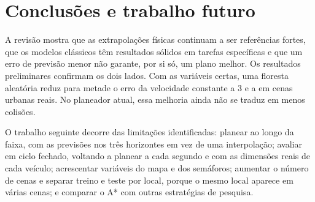 \section{Conclusões e trabalho futuro}
\label{sec:conclusao}

A revisão mostra que as extrapolações físicas continuam a ser referências
fortes, que os modelos clássicos têm resultados sólidos em tarefas
específicas e que um erro de previsão menor não garante, por si só, um
plano melhor. Os resultados preliminares confirmam os dois lados. Com as
variáveis certas, uma floresta aleatória reduz para metade o erro da
velocidade constante a 3 e a  em cenas urbanas reais. No
planeador atual, essa melhoria ainda não se traduz em menos colisões.

O trabalho seguinte decorre das limitações identificadas: planear ao
longo da faixa, com as previsões nos três horizontes em vez de uma
interpolação; avaliar em ciclo fechado, voltando a planear a cada segundo
e com as dimensões reais de cada veículo;
acrescentar variáveis do mapa e dos semáforos; aumentar o número de cenas
e separar treino e teste por local, porque o mesmo local aparece em
várias cenas; e comparar o A* com outras estratégias de pesquisa.
